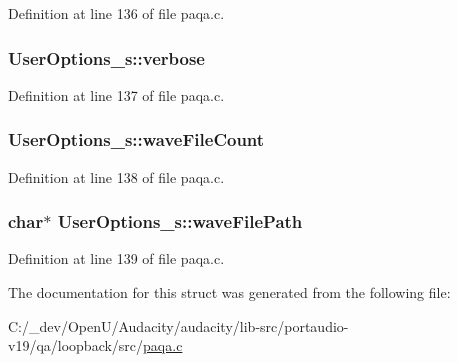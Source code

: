 Definition at line 136 of file paqa.\+c.

\subsubsection[{\texorpdfstring{verbose}{verbose}}]{ User\+Options\+\_\+s\+::verbose}\hypertarget{struct_user_options__s_a1138b348f87d0906ec8ca000fd58e537}{}\label{struct_user_options__s_a1138b348f87d0906ec8ca000fd58e537}


Definition at line 137 of file paqa.\+c.

\subsubsection[{\texorpdfstring{wave\+File\+Count}{waveFileCount}}]{ User\+Options\+\_\+s\+::wave\+File\+Count}\hypertarget{struct_user_options__s_a3c1d3a70ed9aad03cb1b975487dec961}{}\label{struct_user_options__s_a3c1d3a70ed9aad03cb1b975487dec961}


Definition at line 138 of file paqa.\+c.

\subsubsection[{\texorpdfstring{wave\+File\+Path}{waveFilePath}}]{ char$\ast$ User\+Options\+\_\+s\+::wave\+File\+Path}\hypertarget{struct_user_options__s_a7dd5cdc14cbf0ad8403c08576d4a2b83}{}\label{struct_user_options__s_a7dd5cdc14cbf0ad8403c08576d4a2b83}


Definition at line 139 of file paqa.\+c.



The documentation for this struct was generated from the following file\+:\begin{DoxyCompactItemize}
\item 
C\+:/\+\_\+dev/\+Open\+U/\+Audacity/audacity/lib-\/src/portaudio-\/v19/qa/loopback/src/\hyperlink{paqa_8c}{paqa.\+c}\end{DoxyCompactItemize}

